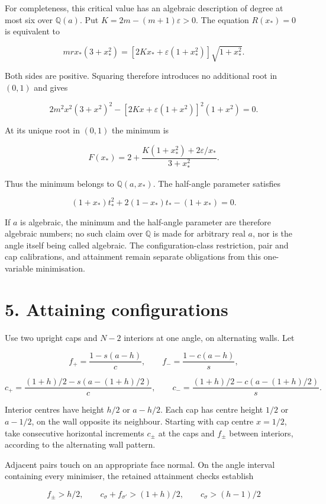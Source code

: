 \documentclass[
  11pt,
  a4paper,
]{article}
\begin{document}
For completeness, this critical value has an algebraic description of
degree at most six over \(\mathbb Q(a)\). Put \(K=2m-(m+1)\varepsilon>0\).
The equation \(R(x_*)=0\) is equivalent to

\[
mr x_*(3+x_*^2)
 =[2Kx_*+\varepsilon(1+x_*^2)]\sqrt{1+x_*^2}.
\]

Both sides are positive. Squaring therefore introduces no additional
root in \((0,1)\) and gives

\[
2m^2x^2(3+x^2)^2
 -[2Kx+\varepsilon(1+x^2)]^2(1+x^2)=0.
\]

At its unique root in \((0,1)\) the minimum is

\[
F(x_*)=2+\frac{K(1+x_*^2)+2\varepsilon/x_*}{3+x_*^2}.
\]

Thus the minimum belongs to \(\mathbb Q(a,x_*)\). The half-angle parameter satisfies

\[
(1+x_*)t_*^2+2(1-x_*)t_*-(1+x_*)=0.
\]

If \(a\) is algebraic, the minimum and the half-angle parameter are therefore
algebraic numbers; no such claim
over \(\mathbb Q\) is made for arbitrary real \(a\), nor is the angle itself
being called algebraic. The configuration-class restriction, pair and cap
calibrations, and attainment remain separate obligations from this
one-variable minimisation.

\section{5. Attaining configurations}\label{attaining-configurations}

Use two upright caps and \(N-2\) interiors at one angle, on alternating
walls. Let

\[
f_+=\frac{1-s(a-h)}c,\qquad
f_-=\frac{1-c(a-h)}s,
\]

\[
c_+=\frac{(1+h)/2-s(a-(1+h)/2)}c,\qquad
c_-=\frac{(1+h)/2-c(a-(1+h)/2)}s.
\]

Interior centres have height \(h/2\) or \(a-h/2\). Each cap has centre
height \(1/2\) or \(a-1/2\), on the wall opposite its neighbour.
Starting with cap centre \(x=1/2\), take consecutive horizontal
increments \(c_\pm\) at the caps and \(f_\pm\) between interiors,
according to the alternating wall pattern.

Adjacent pairs touch on an appropriate face normal. On the angle
interval containing every minimiser, the retained attainment checks
establish

\[
f_\pm>h/2,\qquad
c_\sigma+f_{\sigma'}>(1+h)/2,\qquad
c_\sigma>(h-1)/2
\]
\end{document}
